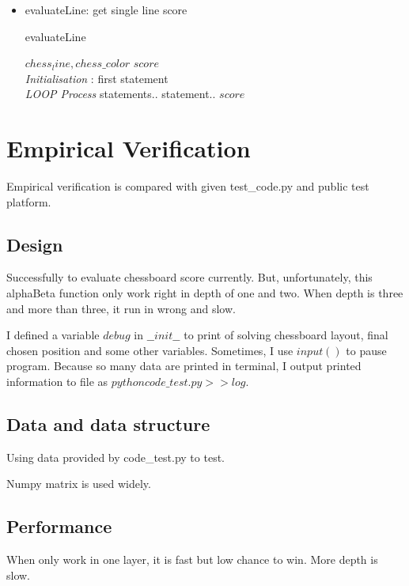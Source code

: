 \documentclass[conference,compsoc]{IEEEtran}
\renewcommand{\algorithmicrequire}{\textbf{Input:}}
\renewcommand{\algorithmicensure}{\textbf{Output:}}
\begin{document}
\begin{itemize}
   \item evaluateLine: get single line score
     \begin{algorithm}[H]
     \caption{evaluateLine}
     \begin{algorithmic}[4]
     \renewcommand{\algorithmicrequire}{\textbf{Input:}}
     \renewcommand{\algorithmicensure}{\textbf{Output:}}
     \REQUIRE $chess_line, chess\_color$
     \ENSURE  $score$
     \\ \textit{Initialisation} :
     \STATE first statement
     \\ \textit{LOOP Process}
     \STATE statements..
     \STATE statement..
     \ENDIF
     \ENDFOR
     \RETURN $score$
     \end{algorithmic}
     \end{algorithm}

\end{itemize}


\section{Empirical Verification}
Empirical verification is compared with given test\_code.py and public test
platform.

\subsection{Design}
Successfully to evaluate chessboard score currently. But, unfortunately, this
alphaBeta function only work right in depth of one and two. When depth is three
and more than three, it run in wrong and slow.

I defined a variable $debug$ in $\_\_init\_\_$ to print of solving chessboard
layout, final chosen position and some other variables. Sometimes, I use
$input()$ to pause program. Because so many data are printed in terminal, I
output printed information to file as $python code\_test.py >> log$.

\subsection{Data and data structure}
Using data provided by code\_test.py to test.

Numpy matrix is used widely.

\subsection{Performance}
When only work in one layer, it is fast but low chance to win. More depth is
slow.
\end{document}
